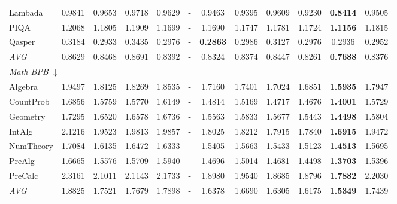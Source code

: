 \begin{table}[htbp]
\begin{tabular}{lccccccccccc}
Lambada & 0.9841 & 0.9653 & 0.9718 & 0.9629 & - & 0.9463 & 0.9395 & 0.9609 & 0.9230 & \textbf{0.8414} & 0.9505 \\
PIQA & 1.2068 & 1.1805 & 1.1909 & 1.1699 & - & 1.1690 & 1.1747 & 1.1781 & 1.1724 & \textbf{1.1156} & 1.1815 \\
Qasper & 0.3184 & 0.2933 & 0.3435 & 0.2976 & - & \textbf{0.2863} & 0.2986 & 0.3127 & 0.2976 & 0.2936 & 0.2952 \\
\textit{AVG} & 0.8629 & 0.8468 & 0.8691 & 0.8392 & - & 0.8324 & 0.8374 & 0.8447 & 0.8261 & \textbf{0.7688} & 0.8376 \\
\midrule
\multicolumn{12}{l}{\textit{Math BPB} $\downarrow$} \\
Algebra & 1.9497 & 1.8125 & 1.8269 & 1.8535 & - & 1.7160 & 1.7401 & 1.7024 & 1.6851 & \textbf{1.5935} & 1.7947 \\
CountProb & 1.6856 & 1.5759 & 1.5770 & 1.6149 & - & 1.4814 & 1.5169 & 1.4717 & 1.4676 & \textbf{1.4001} & 1.5729 \\
Geometry & 1.7295 & 1.6520 & 1.6578 & 1.6736 & - & 1.5563 & 1.5833 & 1.5677 & 1.5443 & \textbf{1.4498} & 1.5804 \\
IntAlg & 2.1216 & 1.9523 & 1.9813 & 1.9857 & - & 1.8025 & 1.8212 & 1.7915 & 1.7840 & \textbf{1.6915} & 1.9472 \\
NumTheory & 1.7084 & 1.6135 & 1.6472 & 1.6333 & - & 1.5405 & 1.5663 & 1.5433 & 1.5123 & \textbf{1.4513} & 1.5695 \\
PreAlg & 1.6665 & 1.5576 & 1.5709 & 1.5940 & - & 1.4696 & 1.5014 & 1.4681 & 1.4498 & \textbf{1.3703} & 1.5396 \\
PreCalc & 2.3161 & 2.1011 & 2.1143 & 2.1733 & - & 1.8980 & 1.9540 & 1.8685 & 1.8796 & \textbf{1.7882} & 2.2030 \\
\textit{AVG} & 1.8825 & 1.7521 & 1.7679 & 1.7898 & - & 1.6378 & 1.6690 & 1.6305 & 1.6175 & \textbf{1.5349} & 1.7439 \\
\bottomrule
\end{tabular}
\end{table}